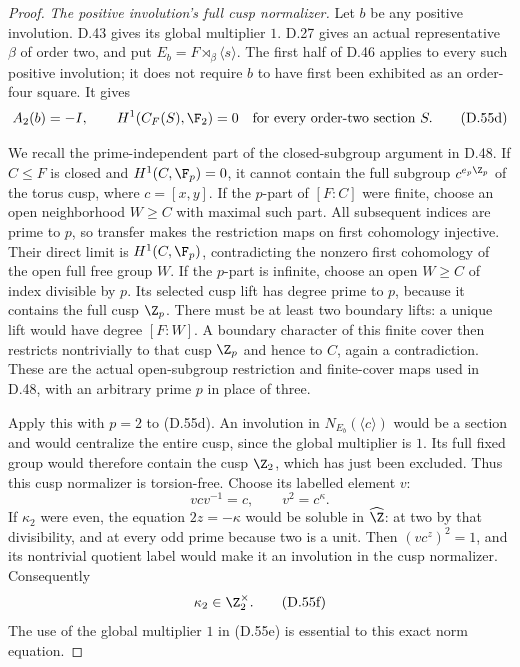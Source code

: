 \begin{proof}
\emph{The positive involution's full cusp normalizer.}
Let $b$ be any positive involution.
D.43 gives its global multiplier $1$.
D.27 gives an actual representative
$\beta$ of order two, and put
$E_b=F\rtimes_\beta\langle s\rangle$.
The first half of D.46 applies to
every such positive involution; it
does not require $b$ to have first
been exhibited as an order-four square.
It gives
\[
        A_2(b)=-I,\qquad
        H^1(C_F(S),\F_2)=0
          \quad\text{for every order-two section }S.
                                                               \tag{D.55d}
\]

We recall the prime-independent part
of the closed-subgroup argument in
D.48. If $C\leq F$ is closed and
$H^1(C,\F_p)=0$, it cannot contain
the full subgroup $c^{e_p\Z_p}$ of
the torus cusp, where $c=[x,y]$.
If the $p$-part of $[F:C]$ were
finite, choose an open neighborhood
$W\geq C$ with maximal such part.
All subsequent indices are prime
to $p$, so transfer makes the
restriction maps on first cohomology
injective. Their direct limit is
$H^1(C,\F_p)$, contradicting the
nonzero first cohomology of the open
full free group $W$.
If the $p$-part is infinite, choose
an open $W\geq C$ of index divisible
by $p$. Its selected cusp lift has
degree prime to $p$, because it
contains the full cusp $\Z_p$.
There must be at least two boundary
lifts: a unique lift would have
degree $[F:W]$.
A boundary character of this finite
cover then restricts nontrivially
to that cusp $\Z_p$ and hence to
$C$, again a contradiction.
These are the actual open-subgroup
restriction and finite-cover maps
used in D.48, with an arbitrary
prime $p$ in place of three.

Apply this with $p=2$ to (D.55d).
An involution in $N_{E_b}(\langle c\rangle)$
would be a section and would centralize
the entire cusp, since the global
multiplier is $1$.
Its full fixed group would therefore
contain the cusp $\Z_2$, which has
just been excluded.
Thus this cusp normalizer is
torsion-free.
Choose its labelled element $v$:
\[
              vcv^{-1}=c,\qquad v^2=c^\kappa.
                                                               \tag{D.55e}
\]
If $\kappa_2$ were even, the equation
$2z=-\kappa$ would be soluble in
$\widehat\Z$: at two by that
divisibility, and at every odd prime
because two is a unit.
Then $(vc^z)^2=1$, and its nontrivial
quotient label would make it an
involution in the cusp normalizer.
Consequently
\[
                             \kappa_2\in\Z_2^\times.
                                                               \tag{D.55f}
\]
The use of the global multiplier
$1$ in (D.55e) is essential to
this exact norm equation.


\end{proof}
